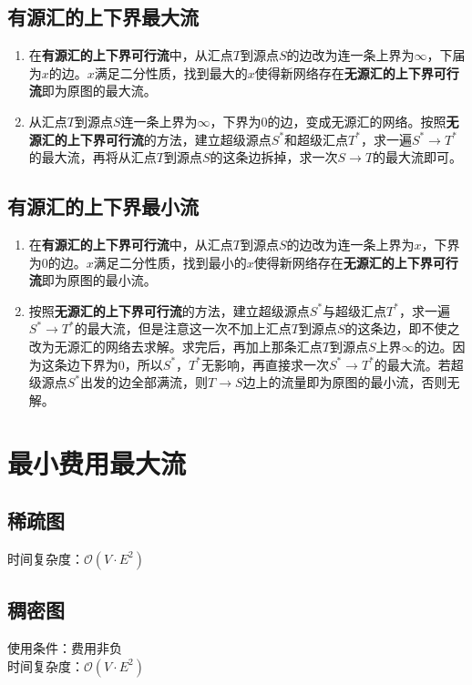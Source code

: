 \documentclass[openany, a4paper, 10pt]{book}
\begin{document}
\begin{spacing}{1.0}
		\subsection{有源汇的上下界最大流}
			\begin{enumerate}
				\item 在\textbf{有源汇的上下界可行流}中，从汇点$T$到源点$S$的边改为连一条上界为$\infty$，下届为$x$的边。$x$满足二分性质，找到最大的$x$使得新网络存在\textbf{无源汇的上下界可行流}即为原图的最大流。
				\item 从汇点$T$到源点$S$连一条上界为$\infty$，下界为$0$的边，变成无源汇的网络。按照\textbf{无源汇的上下界可行流}的方法，建立超级源点$S^*$和超级汇点$T^*$，求一遍$S^* \rightarrow T^*$的最大流，再将从汇点$T$到源点$S$的这条边拆掉，求一次$S \rightarrow T$的最大流即可。
			\end{enumerate}
		\subsection{有源汇的上下界最小流}
			\begin{enumerate}
				\item 在\textbf{有源汇的上下界可行流}中，从汇点$T$到源点$S$的边改为连一条上界为$x$，下界为$0$的边。$x$满足二分性质，找到最小的$x$使得新网络存在\textbf{无源汇的上下界可行流}即为原图的最小流。
				\item 按照\textbf{无源汇的上下界可行流}的方法，建立超级源点$S^*$与超级汇点$T^*$，求一遍$S^* \rightarrow T^*$的最大流，但是注意这一次不加上汇点$T$到源点$S$的这条边，即不使之改为无源汇的网络去求解。求完后，再加上那条汇点$T$到源点$S$上界$\infty$的边。因为这条边下界为$0$，所以$S^*$，$T^*$无影响，再直接求一次$S^* \rightarrow T^*$的最大流。若超级源点$S^*$出发的边全部满流，则$T \rightarrow S$边上的流量即为原图的最小流，否则无解。
			\end{enumerate}
		\section{最小费用最大流}
		\subsection{稀疏图}
			时间复杂度：$\mathcal{O}(V \cdot E^2)$
			
		\subsection{稠密图}
			使用条件：费用非负\\
			\indent 时间复杂度：$\mathcal{O}(V \cdot E^2)$
			

\end{spacing}
\end{document}
